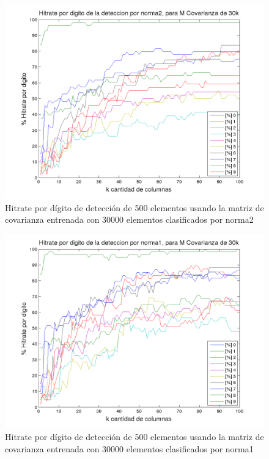 \begin{figure}[H]
\begin {center}
\includegraphics[width=\pdwidth]{plots/pordig-30kcv-norma2.png}
\end {center}
\caption{Hitrate por d\'igito de detecci\'on de 500 elementos usando la matriz de covarianza entrenada con 30000 elementos
clasificados por norma2}
\label{fig:HRD30kcv-n2}
\end{figure}

\begin{figure}[H]
\begin {center}
\includegraphics[width=\pdwidth]{plots/pordig-30kcv-norma1.png}
\end {center}
\caption{Hitrate por d\'igito de detecci\'on de 500 elementos usando la matriz de covarianza entrenada con 30000 elementos
clasificados por norma1}
\label{fig:HRD30kcv-n1}
\end{figure}


